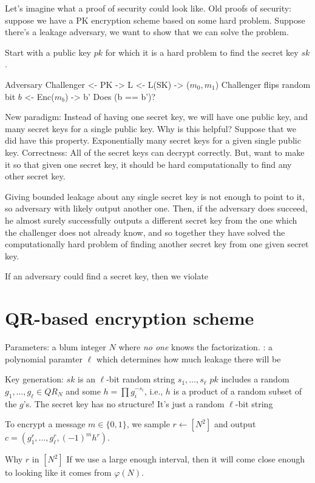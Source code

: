 \documentclass[10pt]{article}
\newcommand{\bit}{\{0,1\}}
\begin{document}
Let's imagine what a proof of security could look like. Old proofs of security: suppose we have a PK encryption scheme based on some hard problem. Suppose there's a leakage adversary, we want to show that we can solve the problem.

Start with a public key $pk$ for which it is a hard problem to find the secret key $sk$.

Adversary            Challenger
<- PK
-> L
<- L(SK)
-> ($m_0, m_1$)
Challenger flips random bit $b$
<- Enc($m_b$)
-> b'
Does (b == b')?

New paradigm: Instead of having one secret key, we will have one public key, and many secret keys for a single public key. Why is this helpful? Suppose that we did have this property. Exponentially many secret keys for a given single public key. Correctness: All of the secret keys can decrypt correctly. But, want to make it so that given one secret key, it should be hard computationally to find any other secret key.

Giving bounded leakage about any single secret key is not enough to point to it, so adversary with likely output another one. Then, if the adversary does succeed, he almost surely successfully outputs a different secret key from the one which the challenger does not already know, and so together they have solved the computationally hard problem of finding another secret key from one given secret key.

If an adversary could find a secret key, then we violate

\section{QR-based encryption scheme}

Parameters: a blum integer $N$ where \emph{no one} knows the factorization.
: a polynomial paramter $\ell$ which determines how much leakage there will be

Key generation:
$sk$ is an $\ell$-bit random string $s_1, \ldots, s_\ell$
$pk$ includes a random $g_1, \ldots, g_\ell \in QR_N$ and some $h = \prod g_i^{-s_i}$, i.e., $h$ is a product of a random subset of the $g$'s. The secret key has no structure! It's just a random $\ell$-bit string

To encrypt a message $m \in \bit$, we sample $r \leftarrow [N^2]$ and output $c = (g_1^r, \ldots, g_\ell^r, (-1)^mh^r)$.

Why $r$ in $[N^2]$ If we use a large enough interval, then it will come close enough to looking like it comes from $\varphi(N)$. 
\end{document}
